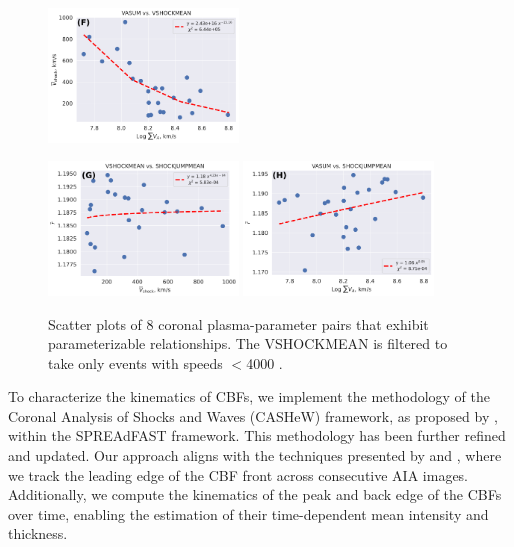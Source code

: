 \begin{figure}[!htp]
{		\includegraphics[width=0.45\textwidth]{chapter2/figs/VASUM_VSHOCKMEAN.pdf}
	}
	\centerline{
		\includegraphics[width=0.45\textwidth]{chapter2/figs/VSHOCKMEAN_SHOCKJUMPMEAN.pdf}
		\includegraphics[width=0.45\textwidth]{chapter2/figs/VASUM_SHOCKJUMPMEAN.pdf}
	}
	\caption{Scatter plots of 8 coronal plasma-parameter pairs that exhibit parameterizable relationships. The VSHOCKMEAN is filtered to take only events with speeds $<$4000 \kms.}
	\label{fig_scatterplot_plasma_param}
\end{figure}



To characterize the kinematics of CBFs, we implement the methodology of the Coronal Analysis of Shocks and Waves (CASHeW) framework, as proposed by \citet{kozarev_2017}, within the SPREAdFAST framework. This methodology has been further refined and updated. Our approach aligns with the techniques presented by \citet{long_2021} and \citet{downs_2021}, where we track the leading edge of the CBF front across consecutive AIA images. Additionally, we compute the kinematics of the peak and back edge of the CBFs over time, enabling the estimation of their time-dependent mean intensity and thickness.

